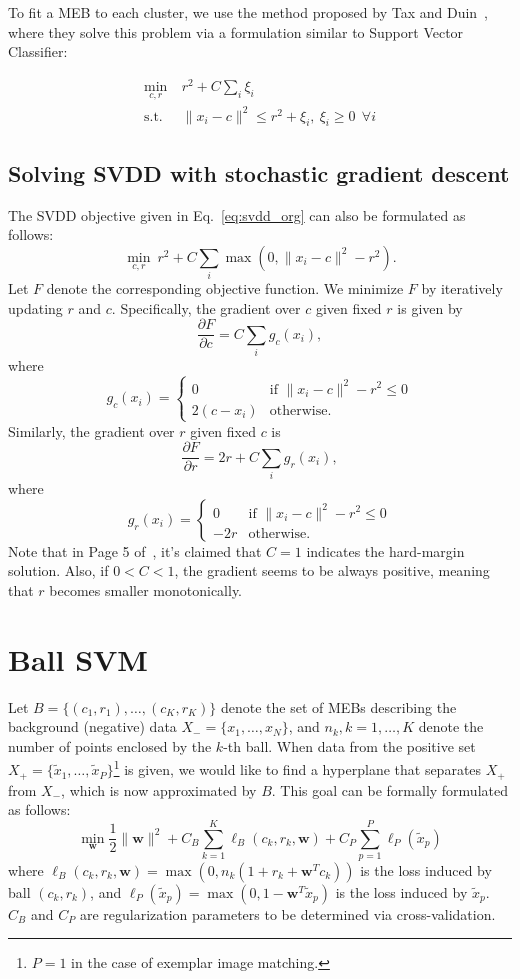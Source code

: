 \documentclass[12pt]{article}
\newcommand{\bw}{\mathbf{w}}
\newcommand{\tx}{\tilde{x}}
\begin{document}
To fit a MEB to each cluster, we use the method proposed by Tax and Duin~\cite{tax04}, where they solve this problem via a formulation similar to Support Vector Classifier:

\begin{align}
\min_{c,r} ~& r^2 + C\sum_i \xi_i \nonumber\\
\text{s.t.} ~& \| x_i - c \|^2 \le r^2 + \xi_i, ~\xi_i \ge 0~ ~\forall i
\label{eq:svdd_org}
\end{align}

\subsection{Solving SVDD with stochastic gradient descent}
The SVDD objective given in Eq.~\ref{eq:svdd_org} can also be formulated as follows:
\begin{equation}
\min_{c,r} ~r^2 + C\sum_i \max(0, \| x_i - c\|^2 - r^2).
\end{equation}
Let $F$ denote the corresponding objective function. We minimize $F$ by iteratively updating $r$ and $c$. Specifically, the gradient over $c$ given fixed $r$ is given by
$$
\frac{\partial F}{\partial c} = C\sum_i g_c(x_i),
$$
where
$$
g_c(x_i) =
  \begin{cases}
   0 & \text{if } \| x_i - c\|^2 - r^2 \le 0  \\
   2(c - x_i) & \text{otherwise}.
  \end{cases}
$$
Similarly, the gradient over $r$ given fixed $c$ is 
$$
\frac{\partial F}{\partial r} = 2r + C\sum_i g_r(x_i),
$$
where
$$
g_r(x_i) =
  \begin{cases}
   0 & \text{if } \| x_i - c\|^2 - r^2 \le 0  \\
   -2r & \text{otherwise}.
  \end{cases}
$$
Note that in Page 5 of~\cite{tax04}, it's claimed that $C = 1$ indicates the hard-margin solution. Also, if $0<C<1$, the gradient seems to be always positive, meaning that $r$ becomes smaller monotonically. 

\section{Ball SVM}
Let $B = \{ (c_1, r_1), \ldots, (c_K, r_K) \}$ denote the set of MEBs describing the background (negative) data $X_- = \{x_1, \ldots, x_N \}$, and $n_k, k = 1, \ldots, K$ denote the number of points enclosed by the $k$-th ball. When data from the positive set $X_+ = \{\tx_1, \ldots, \tx_P \}$\footnote{$P=1$ in the case of exemplar image matching.} is given, we would like to find a hyperplane that separates $X_+$ from $X_-$, which is now approximated by $B$. This goal can be formally formulated as follows:
\begin{equation}
\min_\bw \frac{1}{2}\|\bw \|^2 + C_B\sum_{k = 1}^K \ell_B(c_k, r_k, \bw) + C_P\sum_{p=1}^P \ell_P(\tx_p)
\end{equation}
where $\ell_B(c_k, r_k, \bw) = \max(0, n_k (1 + r_k  + \bw^Tc_k))$ is the loss induced by ball $(c_k, r_k)$, and $\ell_P(\tx_p) = \max(0, 1 - \bw^T\tx_p)$ is the loss induced by $\tx_p$. $C_B$ and $C_P$ are regularization parameters to be determined via cross-validation.
\end{document}
